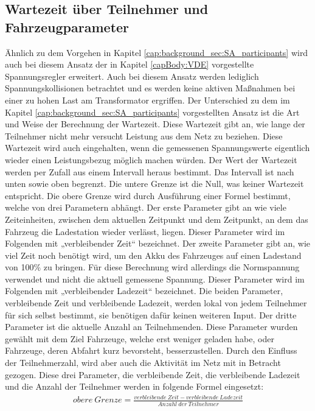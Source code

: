 \subsection{Wartezeit über Teilnehmer und Fahrzeugparameter}
\label{cap:background_sec:SA_waitingTime}
Ähnlich zu dem Vorgehen in Kapitel \ref{cap:background_sec:SA_participants} wird auch bei diesem Ansatz der in Kapitel \ref{capBody:VDE} vorgestellte Spannungsregler erweitert. Auch bei diesem Ansatz werden lediglich Spannungskollisionen betrachtet und es werden keine aktiven Maßnahmen bei einer zu hohen Last am Transformator ergriffen. Der Unterschied zu dem im Kapitel \ref{cap:background_sec:SA_participants} vorgestellten Ansatz ist die Art und Weise der Berechnung der Wartezeit. Diese Wartezeit gibt an, wie lange der Teilnehmer nicht mehr versucht Leistung aus dem Netz zu beziehen. Diese Wartezeit wird auch eingehalten, wenn die gemessenen Spannungswerte eigentlich wieder einen Leistungsbezug möglich machen würden. Der Wert der Wartezeit werden per Zufall aus einem Intervall heraus bestimmt. Das Intervall ist nach unten sowie oben begrenzt. Die untere Grenze ist die Null, was keiner Wartezeit entspricht. Die obere Grenze wird durch Ausführung einer Formel bestimmt, welche von drei Parametern abhängt.  Der erste Parameter gibt an wie viele Zeiteinheiten, zwischen dem aktuellen Zeitpunkt und dem Zeitpunkt, an dem das Fahrzeug die Ladestation wieder verlässt, liegen. Dieser Parameter wird im Folgenden mit „verbleibender Zeit“ bezeichnet. Der zweite Parameter gibt an, wie viel Zeit noch benötigt wird, um den Akku des Fahrzeuges auf einen Ladestand von 100\% zu bringen. Für diese Berechnung wird allerdings die Normspannung verwendet und nicht die aktuell gemessene Spannung. Dieser Parameter wird im Folgenden mit „verbleibender Ladezeit“ bezeichnet. Die beiden Parameter, verbleibende Zeit und verbleibende Ladezeit, werden lokal von jedem Teilnehmer für sich selbst bestimmt, sie benötigen dafür keinen weiteren Input. Der dritte Parameter ist die aktuelle Anzahl an Teilnehmenden. Diese Parameter wurden gewählt mit dem Ziel Fahrzeuge, welche erst weniger geladen habe, oder Fahrzeuge, deren Abfahrt kurz bevorsteht, besserzustellen. Durch den Einfluss der Teilnehmerzahl, wird aber auch die Aktivität im Netz mit in Betracht gezogen. Diese drei Parameter, die verbleibende Zeit, die verbleibende Ladezeit und die Anzahl der Teilnehmer werden in folgende Formel eingesetzt:
\begin{align}
	obere \ Grenze = \frac{verbleibende\ Zeit - verbleibende\ Ladezeit}{Anzahl\ der\ Teilnehmer}
	\label{SA:formel4}
\end{align}

